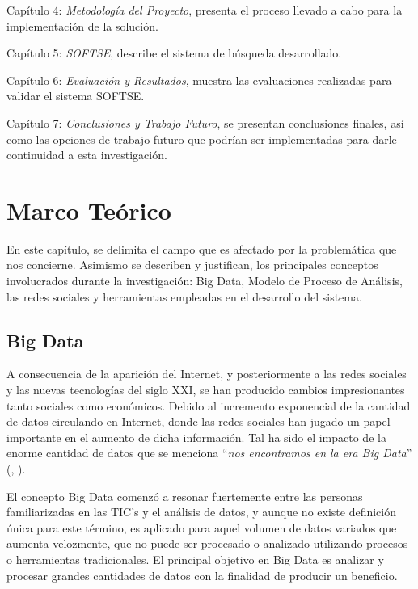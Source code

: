Cap\'itulo 4: \textit{Metodología del Proyecto}, presenta el proceso llevado a cabo para la implementaci\'on de la soluci\'on.

Cap\'itulo 5: \textit{SOFTSE}, describe el sistema de búsqueda desarrollado.

Cap\'itulo 6: \textit{Evaluación y Resultados}, muestra las evaluaciones realizadas para validar el sistema SOFTSE.

Cap\'itulo 7: \textit{Conclusiones y Trabajo Futuro}, se presentan conclusiones finales, así como las opciones de trabajo futuro que podrían ser implementadas para darle continuidad a esta investigación.


\chapter{Marco Te\'orico}
\label{chap:marco}

En este capítulo, se delimita el campo que es afectado por la problemática que nos concierne. Asimismo se describen y justifican, los principales conceptos involucrados durante la investigación: Big Data, Modelo de Proceso de Análisis, las redes sociales y herramientas empleadas en el desarrollo del sistema.

\section{Big Data}
\label{sec:sec01}
A consecuencia de la aparición del Internet, y posteriormente a las redes sociales y las nuevas tecnologías del siglo XXI, se han producido cambios impresionantes tanto sociales como económicos. Debido al incremento exponencial de la cantidad de datos circulando en Internet, donde las redes sociales han jugado un papel importante en el aumento de dicha información. Tal ha sido el impacto de la enorme cantidad de datos que se menciona “\textit{nos encontramos en la era Big Data}” (\citeauthor{bigdata_art}, \citeyear{bigdata_art}).

El concepto Big Data comenzó a resonar fuertemente entre las personas familiarizadas en  las TIC’s y el análisis de datos, y aunque no existe definición única para este término, es aplicado para aquel volumen de datos variados que aumenta velozmente, que no puede ser procesado o analizado utilizando procesos o herramientas tradicionales. El principal objetivo en Big Data es analizar y procesar grandes cantidades de datos con la finalidad de producir un beneficio.

